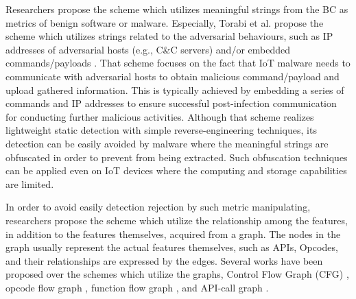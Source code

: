 \documentclass{ieeeaccess}
\begin{document}
Researchers \cite{om, hwang} propose the scheme which utilizes meaningful strings from the BC as metrics of benign software or malware.
Especially, Torabi et al. propose the scheme which utilizes strings related to the adversarial behaviours, such as IP addresses of adversarial hosts (e.g., C\&C servers) and/or embedded commands/payloads \cite{om}.
That scheme focuses on the fact that IoT malware needs to communicate with adversarial hosts to obtain malicious command/payload and upload gathered information.
This is typically achieved by embedding a series of commands and IP addresses to ensure successful post-infection communication for conducting further malicious activities. 
Although that scheme realizes lightweight static detection with simple reverse-engineering techniques, its detection can be easily avoided by malware where the meaningful strings are obfuscated in order to prevent from being extracted.
Such obfuscation techniques can be applied even on IoT devices where the computing and storage capabilities are limited.


In order to avoid easily detection rejection by such metric manipulating, researchers \cite{cfg, cfg2} propose the scheme which utilize the relationship among the features, in addition to the features themselves, acquired from a graph.
The nodes in the graph usually represent the actual features themselves, such as APIs, Opcodes, and their relationships are expressed by the edges.
Several works have been proposed over the schemes which utilize the graphs, Control Flow Graph (CFG) \cite{cfg, cfg2}, opcode flow graph \cite{op-graph}, function flow graph \cite{func-graph}, and API-call graph \cite{api-graph}.
\end{document}

